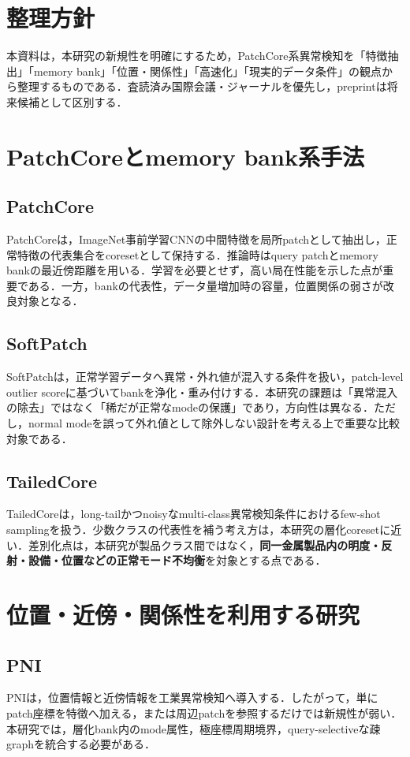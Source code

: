 \documentclass[a4paper,11pt]{ltjsarticle}
\begin{document}

\section{整理方針}
本資料は，本研究の新規性を明確にするため，PatchCore系異常検知を「特徴抽出」「memory bank」「位置・関係性」「高速化」「現実的データ条件」の観点から整理するものである．査読済み国際会議・ジャーナルを優先し，preprintは将来候補として区別する．

\section{PatchCoreとmemory bank系手法}
\subsection{PatchCore}
PatchCoreは，ImageNet事前学習CNNの中間特徴を局所patchとして抽出し，正常特徴の代表集合をcoresetとして保持する．推論時はquery patchとmemory bankの最近傍距離を用いる．学習を必要とせず，高い局在性能を示した点が重要である．一方，bankの代表性，データ量増加時の容量，位置関係の弱さが改良対象となる．

\subsection{SoftPatch}
SoftPatchは，正常学習データへ異常・外れ値が混入する条件を扱い，patch-level outlier scoreに基づいてbankを浄化・重み付けする．本研究の課題は「異常混入の除去」ではなく「稀だが正常なmodeの保護」であり，方向性は異なる．ただし，normal modeを誤って外れ値として除外しない設計を考える上で重要な比較対象である．

\subsection{TailedCore}
TailedCoreは，long-tailかつnoisyなmulti-class異常検知条件におけるfew-shot samplingを扱う．少数クラスの代表性を補う考え方は，本研究の層化coresetに近い．差別化点は，本研究が製品クラス間ではなく，\textbf{同一金属製品内の明度・反射・設備・位置などの正常モード不均衡}を対象とする点である．

\section{位置・近傍・関係性を利用する研究}
\subsection{PNI}
PNIは，位置情報と近傍情報を工業異常検知へ導入する．したがって，単にpatch座標を特徴へ加える，または周辺patchを参照するだけでは新規性が弱い．本研究では，層化bank内のmode属性，極座標周期境界，query-selectiveな疎graphを統合する必要がある．
\end{document}
